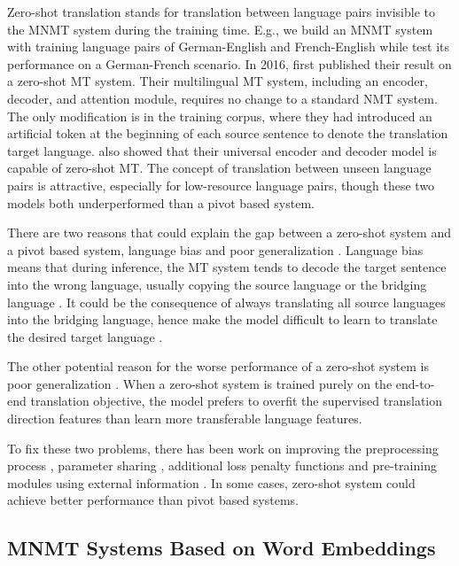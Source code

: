 \documentclass[thesis,fonts=libertine]{cluu}
\begin{document}
Zero-shot translation stands for translation between language pairs invisible to the MNMT system during the training time. E.g., we build an MNMT system with training language pairs of German-English and French-English while test its performance on a German-French scenario. In 2016, \cite{Johnson:2016aa} first published their result on a zero-shot MT system. Their multilingual MT system, including an encoder, decoder, and attention module, requires no change to a standard NMT system. The only modification is in the training corpus, where they had introduced an artificial token at the beginning of each source sentence to denote the translation target language. \cite{Ha:2016aa} also showed that their universal encoder and decoder model is capable of zero-shot MT. The concept of translation between unseen language pairs is attractive, especially for low-resource language pairs, though these two models both underperformed than a pivot based system.

There are two reasons that could explain the gap between a zero-shot system and a pivot based system, language bias \parencite{Ha:2016aa, Ha:2017aa, Arivazhagan:2019aa} and poor generalization \parencite{Arivazhagan:2019aa}. Language bias means that during inference, the MT system tends to decode the target sentence into the wrong language, usually copying the source language or the bridging language \cite{Ha:2016aa}. It could be the consequence of always translating all source languages into the bridging language, hence make the model difficult to learn to translate the desired target language \parencite{Arivazhagan:2019aa}.

The other potential reason for the worse performance of a zero-shot system is poor generalization \parencite{Arivazhagan:2019aa}. When a zero-shot system is trained purely on the end-to-end translation objective, the model prefers to overfit the supervised translation direction features than learn more transferable language features.

To fix these two problems, there has been work on improving the preprocessing process \parencite{Lakew:2018aa}, parameter sharing \parencite{Firat:2016aa, Blackwood:2018aa}, additional loss penalty functions \parencite{Arivazhagan:2019aa} and pre-training modules using external information \parencite{Baziotis:2020aa}. In some cases, zero-shot system could achieve better performance than pivot based systems.

\subsection{MNMT Systems Based on Word Embeddings}
\end{document}

